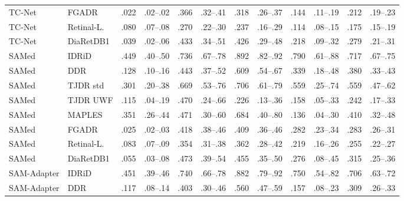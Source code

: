 \begin{landscape}
{\begin{longtable}{l l c c c c c c c c c c}
TC-Net & FGADR & .022 & \scriptsize .02--.02 & .366 & \scriptsize .32--.41 & .318 & \scriptsize .26--.37 & .144 & \scriptsize .11--.19 & .212 & \scriptsize .19--.23 \\
TC-Net & Retinal-L. & .080 & \scriptsize .07--.08 & .270 & \scriptsize .22--.30 & .237 & \scriptsize .16--.29 & .114 & \scriptsize .08--.15 & .175 & \scriptsize .15--.19 \\
TC-Net & DiaRetDB1 & .039 & \scriptsize .02--.06 & .433 & \scriptsize .34--.51 & .426 & \scriptsize .29--.48 & .218 & \scriptsize .09--.32 & .279 & \scriptsize .21--.31 \\
SAMed & IDRiD & .449 & \scriptsize .40--.50 & .736 & \scriptsize .67--.78 & .892 & \scriptsize .82--.92 & .790 & \scriptsize .61--.88 & .717 & \scriptsize .67--.75 \\
SAMed & DDR & .128 & \scriptsize .10--.16 & .443 & \scriptsize .37--.52 & .609 & \scriptsize .54--.67 & .339 & \scriptsize .18--.48 & .380 & \scriptsize .33--.43 \\
SAMed & TJDR std & .301 & \scriptsize .20--.38 & .669 & \scriptsize .53--.76 & .706 & \scriptsize .61--.79 & .559 & \scriptsize .25--.74 & .559 & \scriptsize .47--.62 \\
SAMed & TJDR UWF & .115 & \scriptsize .04--.19 & .470 & \scriptsize .24--.66 & .226 & \scriptsize .13--.36 & .158 & \scriptsize .05--.33 & .242 & \scriptsize .17--.33 \\
SAMed & MAPLES & .351 & \scriptsize .26--.44 & .471 & \scriptsize .30--.60 & .684 & \scriptsize .40--.80 & .136 & \scriptsize .04--.30 & .410 & \scriptsize .32--.48 \\
SAMed & FGADR & .025 & \scriptsize .02--.03 & .418 & \scriptsize .38--.46 & .409 & \scriptsize .36--.46 & .282 & \scriptsize .23--.34 & .283 & \scriptsize .26--.31 \\
SAMed & Retinal-L. & .083 & \scriptsize .07--.09 & .354 & \scriptsize .31--.38 & .362 & \scriptsize .28--.42 & .219 & \scriptsize .16--.26 & .255 & \scriptsize .22--.27 \\
SAMed & DiaRetDB1 & .055 & \scriptsize .03--.08 & .473 & \scriptsize .39--.54 & .455 & \scriptsize .35--.50 & .276 & \scriptsize .08--.45 & .315 & \scriptsize .25--.36 \\
SAM-Adapter & IDRiD & .451 & \scriptsize .39--.46 & .740 & \scriptsize .66--.78 & .882 & \scriptsize .79--.92 & .750 & \scriptsize .54--.82 & .706 & \scriptsize .63--.72 \\
SAM-Adapter & DDR & .117 & \scriptsize .08--.14 & .403 & \scriptsize .30--.46 & .560 & \scriptsize .47--.59 & .157 & \scriptsize .08--.23 & .309 & \scriptsize .26--.33 \\

\end{longtable}}
\end{landscape}
